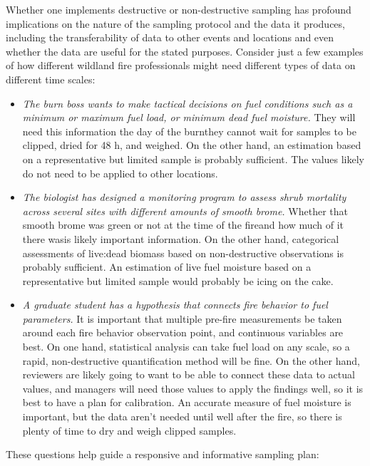 Whether one implements destructive or non-destructive sampling has profound implications on the nature of the sampling protocol and the data it produces, including the transferability of data to other events and locations and even whether the data are useful for the stated purposes. 
Consider just a few examples of how different wildland fire professionals might need different types of data on different time scales: 
\begin{itemize}
	\item \emph{The burn boss wants to make tactical decisions on fuel conditions such as a minimum or maximum fuel load, or minimum dead fuel moisture.} 
	They will need this information the day of the burn\textemdash they cannot wait for samples to be clipped, dried for 48 h, and weighed. 
	On the other hand, an estimation based on a representative but limited sample is probably sufficient. 
	The values likely do not need to be applied to other locations. 
	\item \emph{The biologist has designed a monitoring program to assess shrub mortality across several sites with different amounts of smooth brome.} 
	Whether that smooth brome was green or not at the time of the fire\textemdash and how much of it there was\textemdash is likely important information. 
	On the other hand, categorical assessments of live:dead biomass based on non-destructive observations is probably sufficient.
	An estimation of live fuel moisture based on a representative but limited sample would probably be icing on the cake. 
	\item \emph{A graduate student has a hypothesis that connects fire behavior to fuel parameters.} 
	It is important that multiple pre-fire measurements be taken around each fire behavior observation point, and continuous variables are best. 
	On one hand, statistical analysis can take fuel load on any scale, so a rapid, non-destructive quantification method will be fine.
	On the other hand, reviewers are likely going to want to be able to connect these data to actual values, and managers will need those values to apply the findings well, so it is best to have a plan for calibration. 
	An accurate measure of fuel moisture is important, but the data aren't needed until well after the fire, so there is plenty of time to dry and weigh clipped samples. 
\end{itemize}  

These questions help guide a responsive and informative sampling plan: 

